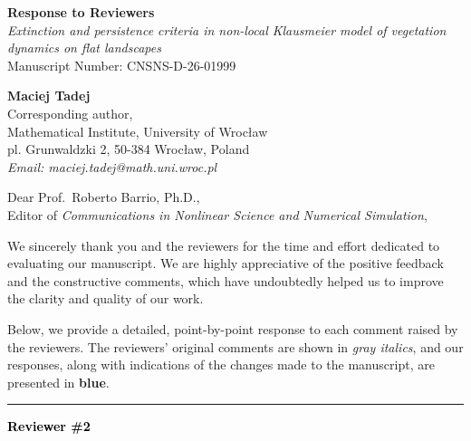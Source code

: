 \documentclass[11pt,a4paper]{article}
\newcommand{\reviewer}[1]{\vspace{1em}\noindent\textbf{\textcolor{black}{#1}}}
\begin{document}
\begin{center}
    \Large\textbf{Response to Reviewers} \\[1em]
    \large\textit{Extinction and persistence criteria in non-local Klausmeier model of vegetation dynamics on flat landscapes} \\[0.5em]
    \normalsize Manuscript Number: CNSNS-D-26-01999 \\[1em]
\end{center}

\vspace{1em}
\noindent\textbf{Maciej Tadej} \\
Corresponding author, \\
Mathematical Institute, University of Wrocław \\
pl. Grunwaldzki 2, 50-384 Wrocław, Poland \\
\textit{Email: maciej.tadej@math.uni.wroc.pl}
\vspace{2em}

\noindent Dear Prof.\ Roberto Barrio, Ph.D., \\ Editor of \textit{Communications in Nonlinear Science and Numerical Simulation},

\vspace{0.5em}
\noindent We sincerely thank you and the reviewers for the time and effort dedicated to evaluating our manuscript. We are highly appreciative of the positive feedback and the constructive comments, which have undoubtedly helped us to improve the clarity and quality of our work. 

Below, we provide a detailed, point-by-point response to each comment raised by the reviewers. The reviewers' original comments are shown in \textit{\textcolor{revcolor}{gray italics}}, and our responses, along with indications of the changes made to the manuscript, are presented in \textbf{\textcolor{authorcolor}{blue}}.

\vspace{2em}
\hrule
\vspace{2em}

\reviewer{Reviewer \#2}
\end{document}
